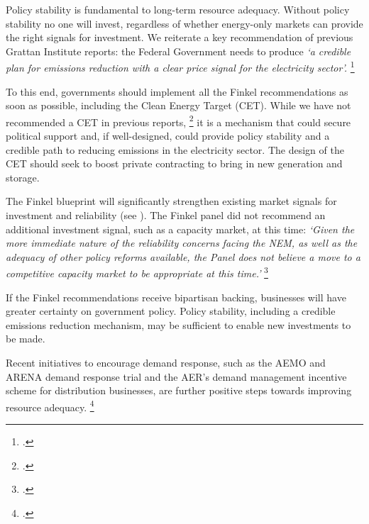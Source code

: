 \documentclass[FrontPage]{grattan}
\begin{document}
Policy stability is fundamental to long-term resource adequacy. Without policy stability no one will invest, regardless of whether energy-only markets can provide the right signals for investment. We reiterate a key recommendation of previous Grattan Institute reports: the Federal Government needs to produce \emph{`a credible plan for emissions reduction with a clear price signal for the electricity sector'.}
\footcites{WoodBlowers-2017-Powering-Through}{WoodBlowers-2016-Keeping-the-lights-on-SA}{WoodBlowers-2016-Climate-phoenix}

To this end, governments should implement all the Finkel recommendations as soon as possible, including the Clean Energy Target (CET). While we have not recommended a CET in previous reports,%
\footcites{WoodBlowers-2016-Climate-phoenix}
it is a mechanism that could secure political support and, if well-designed, could provide policy stability and a credible path to reducing emissions in the electricity sector. The design of the CET should seek to boost private contracting to bring in new generation and storage.

The Finkel blueprint will significantly strengthen existing market signals for investment and reliability (see ). The Finkel panel did not recommend an additional investment signal, such as a capacity market, at this time: \emph{`Given the more immediate nature of the reliability concerns facing the NEM, as well as the adequacy of other policy reforms available, the Panel does not believe a move to a competitive capacity market to be appropriate at this time.'}
\footcite[][85]{Finkel2017ReviewFinal}

If the Finkel recommendations receive bipartisan backing, businesses will have greater certainty on government policy. Policy stability, including a credible emissions reduction mechanism, may be sufficient to enable new investments to be made.

Recent initiatives to encourage demand response, such as the AEMO and ARENA demand response trial and the AER's demand management incentive scheme for distribution businesses, are further positive steps towards improving resource adequacy.%
\footcites{AEMOARENA2017DemandTrial}{AER2016DemandMgmtDistribution}
\end{document}
